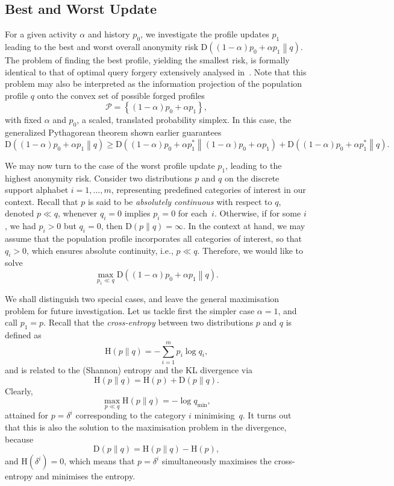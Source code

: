 \subsection{Best and Worst Update}
\label{sec:1.6}

\noindent
For a given activity $\alpha$ and history $p_0$, we investigate the profile updates $p_1$ leading to the best and worst overall anonymity risk $\text{D}\left((1-\alpha)p_0+\alpha p_1\middle\|q\right)$. The problem of finding the best profile, yielding the smallest risk, is formally identical to that of optimal query forgery extensively analysed in~\cite{Rebollo10IT}. Note that this problem may also be interpreted as the information projection of the population profile $q$ onto the convex set of possible forged profiles
$$\mathscr{P}=\left\{(1-\alpha)p_0+\alpha p_1\right\},$$
with fixed $\alpha$ and $p_0$, a scaled, translated probability simplex. In this case, the generalized Pythagorean theorem shown earlier guarantees
$$\text{D}\left((1-\alpha)p_0+\alpha p_1\middle\|q\right)\geqslant\text{D}\left((1-\alpha)p_0+\alpha p_1^*\middle\|(1-\alpha)p_0+\alpha p_1\right)+\text{D}\left((1-\alpha)p_0+\alpha p_1^*\middle\|q\right).$$

We may now turn to the case of the worst profile update $p_1$, leading to the highest anonymity risk. Consider two distributions $p$ and $q$ on the discrete support alphabet $i=1,\dots,m$, representing predefined categories of interest in our context. Recall that $p$ is said to be \emph{absolutely continuous} with respect to $q$, denoted $p\ll q$, whenever $q_i=0$ implies $p_i=0$ for each~$i$. Otherwise, if for some $i$, we had $p_i>0$ but $q_i=0$, then $\text{D}(p\|q)=\infty$. In the context at hand, we may assume that the population profile incorporates all categories of interest, so that $q_i>0$, which ensures absolute continuity, i.e., $p\ll q$. Therefore, we would like to solve 
$$\max_{p_1\ll q} \text{D}\left((1-\alpha)p_0+\alpha p_1\middle\|q\right).$$

We shall distinguish two special cases, and leave the general maximisation problem for future investigation. Let us tackle first the simpler case $\alpha=1$, and call $p_1=p$. Recall that the \emph{cross\hyp entropy} between two distributions $p$ and $q$ is defined as
$$\text{H}(p\|q)=-\sum_{i=1}^m p_i\log q_i,$$
and is related to the (Shannon) entropy and the KL divergence via
$$\text{H}(p\|q)=\text{H}(p)+\text{D}(p\|q).$$
Clearly,
$$\max_{p\ll q} \text{H}(p\|q)=-\log q_\text{min},$$
attained for $p=\delta^i$ corresponding to the category $i$ minimising~$q$. It turns out that this is also the solution to the maximisation problem in the divergence, because 
$$\text{D}(p\|q)=\text{H}(p\|q)-\text{H}(p),$$
and $\text{H}(\delta^i)=0$, which means that $p=\delta^i$ simultaneously maximises the cross\hyp entropy and minimises the entropy.


